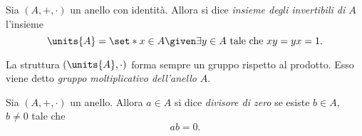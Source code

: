 \begin{definition} 
    \label{def:invertibili}
    Sia $(A, +, \cdot)$ un anello con identità. Allora si dice \emph{insieme degli invertibili di $A$} l'insieme \[
        \units{A} = \set*{x \in A \given \exists y \in A \text{ tale che } xy = yx = 1}.
    \]
\end{definition}

\begin{remark}
    La struttura $(\units{A}, \cdot)$ forma sempre un gruppo rispetto al prodotto. Esso viene detto \emph{gruppo moltiplicativo dell'anello} $A$.
\end{remark}

\begin{definition}
    \label{def:div_zero}
    Sia $(A, +, \cdot)$ un anello. Allora $a \in A$ si dice \emph{divisore di zero} se esiste $b \in A$, $b \neq 0$ tale che \[
        ab = 0.
    \]
\end{definition}

